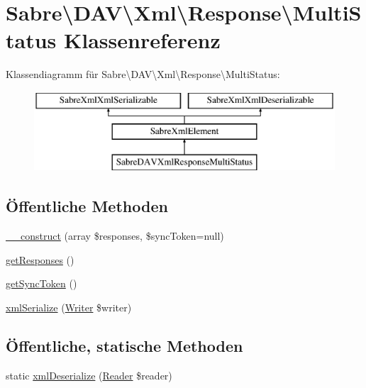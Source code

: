 \hypertarget{class_sabre_1_1_d_a_v_1_1_xml_1_1_response_1_1_multi_status}{}\section{Sabre\textbackslash{}D\+AV\textbackslash{}Xml\textbackslash{}Response\textbackslash{}Multi\+Status Klassenreferenz}
\label{class_sabre_1_1_d_a_v_1_1_xml_1_1_response_1_1_multi_status}
Klassendiagramm für Sabre\textbackslash{}D\+AV\textbackslash{}Xml\textbackslash{}Response\textbackslash{}Multi\+Status\+:\begin{figure}[H]
\begin{center}
\leavevmode
\includegraphics[height=3.000000cm]{class_sabre_1_1_d_a_v_1_1_xml_1_1_response_1_1_multi_status}
\end{center}
\end{figure}
\subsection*{Öffentliche Methoden}
\begin{DoxyCompactItemize}
\item 
\mbox{\hyperlink{class_sabre_1_1_d_a_v_1_1_xml_1_1_response_1_1_multi_status_a0a2ba99ea42da2ca7218aeb3e1ec59a8}{\+\_\+\+\_\+construct}} (array \$responses, \$sync\+Token=null)
\item 
\mbox{\hyperlink{class_sabre_1_1_d_a_v_1_1_xml_1_1_response_1_1_multi_status_a3f57a1d5e7b37f32cd916d98853a821d}{get\+Responses}} ()
\item 
\mbox{\hyperlink{class_sabre_1_1_d_a_v_1_1_xml_1_1_response_1_1_multi_status_ab50e2bbf986734a2b925c544fbc67ec5}{get\+Sync\+Token}} ()
\item 
\mbox{\hyperlink{class_sabre_1_1_d_a_v_1_1_xml_1_1_response_1_1_multi_status_a91767722f4c127274426027cc6006d18}{xml\+Serialize}} (\mbox{\hyperlink{class_sabre_1_1_xml_1_1_writer}{Writer}} \$writer)
\end{DoxyCompactItemize}
\subsection*{Öffentliche, statische Methoden}
\begin{DoxyCompactItemize}
\item 
static \mbox{\hyperlink{class_sabre_1_1_d_a_v_1_1_xml_1_1_response_1_1_multi_status_ab150dac22311af6610e03ffed21fe33c}{xml\+Deserialize}} (\mbox{\hyperlink{class_sabre_1_1_xml_1_1_reader}{Reader}} \$reader)
\end{DoxyCompactItemize}
